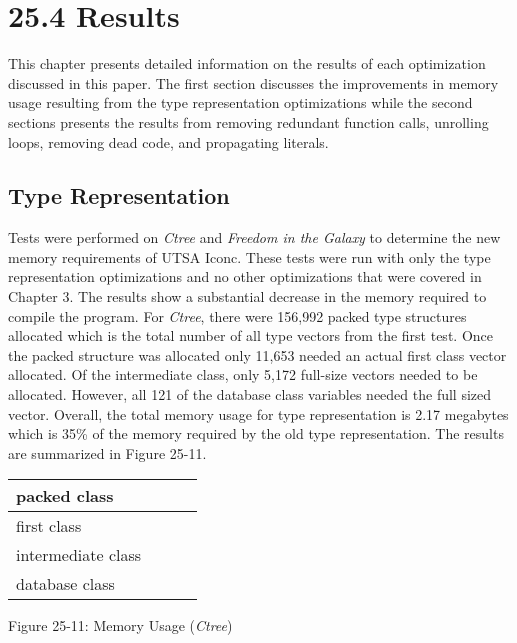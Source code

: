 \section[25.4 Results]{25.4 Results}

This chapter presents detailed information on the results of each
optimization discussed in this paper. The first section discusses the
improvements in memory usage resulting from the type representation
optimizations while the second sections presents the results from
removing redundant function calls, unrolling loops, removing dead
code, and propagating literals.

\subsection{Type Representation}

Tests were performed on \textit{Ctree} and \textit{Freedom in the
Galaxy} to determine the new memory requirements of UTSA Iconc. These
tests were run with only the type representation optimizations and no
other optimizations that were covered in Chapter 3. The results show a
substantial decrease in the memory required to compile the
program. For \textit{Ctree}, there were 156,992 packed type structures
allocated which is the total number of all type vectors from the first
test. Once the packed structure was allocated only 11,653 needed an
actual first class vector allocated.  Of the intermediate class, only
5,172 full-size vectors needed to be allocated. However, all 121 of
the database class variables needed the full sized vector. Overall,
the total memory usage for type representation is 2.17 megabytes which
is 35\% of the memory required by the old type representation. The
results are summarized in Figure 25-11.

\begin{center}
\tabletail{}
\tablelasttail{}
\begin{supertabular}{|m{1.2163599in}|m{1.1969599in}|m{1.2538599in}|m{1.6636599in}|}
\hline
 packed class &
 &
 &
\raggedleft{}\\\hline
 first class &
 &
 &
\raggedleft{}\\\hline
 intermediate class &
 &
 &
\raggedleft{}\\\hline
 database class &
 &
 &
\raggedleft{}\\\hline
\end{supertabular}
\end{center}
{\centering{}
Figure 25-11: Memory Usage (\textit{Ctree})
\par}


